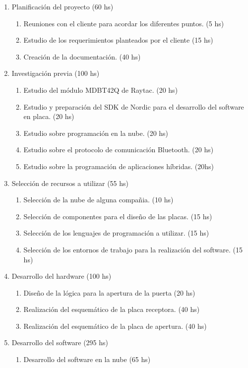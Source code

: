 \documentclass[11pt]{charter}
\begin{document}
\begin{enumerate}
\item Planificación del proyecto (60 hs)
	\begin{enumerate}
	\item Reuniones con el cliente para acordar los diferentes puntos. (5 hs)
	\item Estudio de los requerimientos planteados por el cliente (15 hs)
	\item Creación de la documentación. (40 hs)
	\end{enumerate}
\item Investigación previa (100 hs)
	\begin{enumerate}
	\item Estudio del módulo MDBT42Q de Raytac. (20 hs)
	\item Estudio y preparación del SDK de Nordic para el desarrollo del software en placa. (20 hs)
	\item Estudio sobre programación en la nube. (20 hs)
	\item Estudio sobre el protocolo de comunicación Bluetooth. (20 hs)
	\item Estudio sobre la programación de aplicaciones híbridas. (20hs)
	\end{enumerate}
\item Selección de recursos a utilizar (55 hs)
	\begin{enumerate}
	\item Selección de la nube de alguna compañia. (10 hs)
	\item Selección de componentes para el diseño de las placas. (15 hs)
	\item Selección de los lenguajes de programación a utilizar. (15 hs)
	\item Selección de los entornos de trabajo para la realización del software. (15 hs)
	\end{enumerate}
\item Desarrollo del hardware (100 hs)
	\begin{enumerate}
	\item Diseño de la lógica para la apertura de la puerta (20 hs)
	\item Realización del esquemático de la placa receptora. (40 hs)
	\item Realización del esquemático de la placa de apertura. (40 hs)
	\end{enumerate}
\item Desarrollo del software (295 hs)
	\begin{enumerate}
	\item Desarrollo del software en la nube (65 hs)

\end{enumerate}
\end{enumerate}
\end{document}
